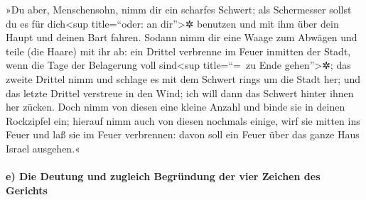 »Du aber, Menschensohn, nimm dir ein scharfes Schwert; als
Schermesser sollst du es für dich\textless sup title=``oder: an
dir''\textgreater✲ benutzen und mit ihm über dein Haupt und deinen Bart
fahren. Sodann nimm dir eine Waage zum Abwägen und teile (die Haare) mit
ihr ab: ein Drittel verbrenne im Feuer inmitten der Stadt,
wenn die Tage der Belagerung voll sind\textless sup title=``=~zu Ende
gehen''\textgreater✲; das zweite Drittel nimm und schlage es mit dem
Schwert rings um die Stadt her; und das letzte Drittel verstreue in den
Wind; ich will dann das Schwert hinter ihnen her zücken.
Doch nimm von diesen eine kleine Anzahl und binde sie in
deinen Rockzipfel ein; hierauf nimm auch von diesen
nochmals einige, wirf sie mitten ins Feuer und laß sie im Feuer
verbrennen: davon soll ein Feuer über das ganze Haus Israel ausgehen.«

\hypertarget{e-die-deutung-und-zugleich-begruxfcndung-der-vier-zeichen-des-gerichts}{%
\paragraph{e) Die Deutung und zugleich Begründung der vier Zeichen des
Gerichts}\label{e-die-deutung-und-zugleich-begruxfcndung-der-vier-zeichen-des-gerichts}}

